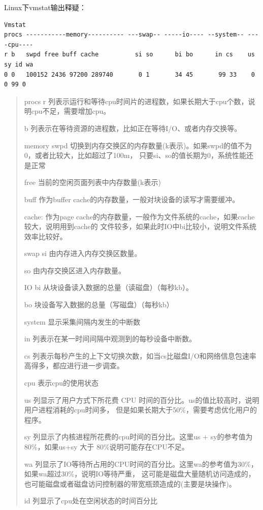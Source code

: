 Linux下vmstat输出释疑：

\begin{verbatim}
Vmstat
procs -----------memory---------- ---swap-- -----io---- --system-- ----cpu----
r b   swpd free buff cache          si so      bi bo      in cs    us sy id wa
0 0   100152 2436 97200 289740       0 1       34 45       99 33    0 0 99 0
\end{verbatim}

\begin{quote}
procs
r 列表示运行和等待cpu时间片的进程数，如果长期大于cpu个数，说明cpu不足，需要增加cpu。

b 列表示在等待资源的进程数，比如正在等待I/O、或者内存交换等。

memory
swpd 切换到内存交换区的内存数量(k表示)。如果swpd的值不为0，或者比较大，比如超过了100m，
     只要si、so的值长期为0，系统性能还是正常

free 当前的空闲页面列表中内存数量(k表示)

buff 作为buffer cache的内存数量，一般对块设备的读写才需要缓冲。

cache: 作为page cache的内存数量，一般作为文件系统的cache，如果cache较大，说明用到cache的
       文件较多，如果此时IO中bi比较小，说明文件系统效率比较好。

swap
si 由内存进入内存交换区数量。

so 由内存交换区进入内存数量。


IO
bi 从块设备读入数据的总量（读磁盘）（每秒kb）。

bo 块设备写入数据的总量（写磁盘）（每秒kb）


system 显示采集间隔内发生的中断数

in 列表示在某一时间间隔中观测到的每秒设备中断数。

cs 列表示每秒产生的上下文切换次数，如当cs比磁盘I/O和网络信息包速率高得多，都应进行进一步调查。



cpu 表示cpu的使用状态

us 列显示了用户方式下所花费 CPU 时间的百分比。us的值比较高时，说明用户进程消耗的cpu时间多，
   但是如果长期大于50\%，需要考虑优化用户的程序。

sy 列显示了内核进程所花费的cpu时间的百分比。这里us + sy的参考值为80\%，如果us+sy 大于
   80\%说明可能存在CPU不足。

wa 列显示了IO等待所占用的CPU时间的百分比。这里wa的参考值为30\%，如果wa超过30\%，说明IO等待严重，
   这可能是磁盘大量随机访问造成的，也可能磁盘或者磁盘访问控制器的带宽瓶颈造成的(主要是块操作)。

id 列显示了cpu处在空闲状态的时间百分比
\end{quote}


